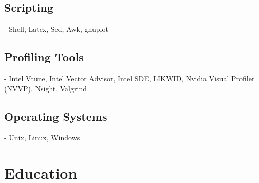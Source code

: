 \documentclass[margin]{res}
\begin{document}
\begin{resume}
    \subsection{Scripting} - Shell, Latex, Sed, Awk, gnuplot
    \subsection{Profiling Tools} - Intel Vtune, Intel Vector Advisor, Intel SDE, LIKWID, Nvidia Visual Profiler (NVVP), Nsight, Valgrind
    \subsection{Operating Systems} - Unix, Linux, Windows


\section{Education}


\end{resume}
\end{document}
